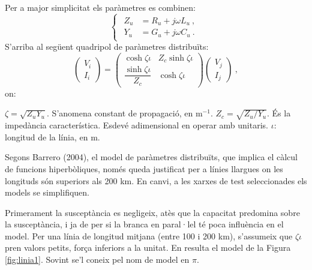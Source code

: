 Per a major simplicitat els paràmetres es combinen:
\begin{equation}
    \begin{cases}
    \begin{split}
        Z_u&=R_u+j\omega L_u\ ,\\
        Y_u&=G_u+j\omega C_u\ .
    \end{split}
\end{cases}
    \label{eq:linia1}
\end{equation}
S'arriba al següent quadripol de paràmetres distribuïts:
\begin{equation}
    \begin{pmatrix}
        V_i \\
        I_i 
    \end{pmatrix}
    =
    \begin{pmatrix}
        \cosh \zeta\iota  & Z_c\sinh \zeta\iota \\
        \dfrac{\sinh \zeta\iota}{Z_c} & \cosh \zeta\iota
    \end{pmatrix}
    \begin{pmatrix}
        V_j \\
        I_j
    \end{pmatrix}\ ,
    \label{eq:quadri3}
\end{equation}
on:

$\zeta=\sqrt{Z_uY_u}$. S'anomena constant de propagació, en m$^{-1}$.
\vs
$Z_c=\sqrt{Z_u/Y_u}$. És la impedància característica. Esdevé adimensional en operar amb unitaris.
\vs
$\iota$: longitud de la línia, en m.

Segons Barrero (2004), el model de paràmetres distribuïts, que implica el càlcul de funcions hiperbòliques, només queda justificat per a línies llargues on les longituds són superiors als 200 km. En canvi, a les xarxes de test seleccionades els models se simplifiquen.

Primerament la susceptància es negligeix, atès que la capacitat predomina sobre la susceptància, i ja de per si la branca en paral·lel té poca influència en el model. Per una línia de longitud mitjana (entre 100 i 200 km), s'assumeix que $\zeta\iota$ pren valors petits, força inferiors a la unitat. En resulta el model de la Figura \ref{fig:linia1}. Sovint se'l coneix pel nom de model en $\pi$.

